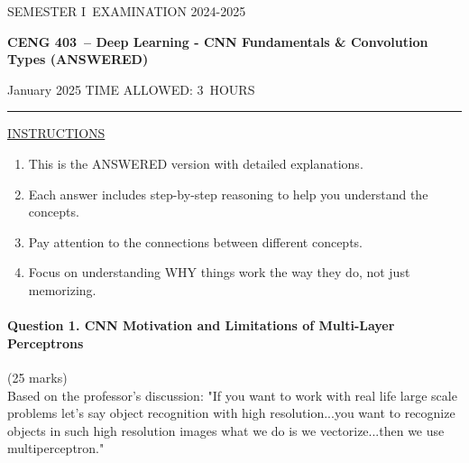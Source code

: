\documentclass[12pt]{article}
\newcommand{\masunitnumber}{CENG 403}
\newcommand{\examdate}{January 2025}
\newcommand{\academicyear}{2024-2025}
\newcommand{\semester}{I}
\newcommand{\coursename}{Deep Learning - CNN Fundamentals \& Convolution Types (ANSWERED)}
\newcommand{\numberofhours}{3}
\begin{document}
\setlength{\headsep}{5truemm}
\setlength{\headheight}{14.5truemm}
\setlength{\voffset}{-0.45truein}
\renewcommand{\headrulewidth}{0.0pt}
\begin{center}
SEMESTER \semester\ EXAMINATION \academicyear
\end{center}
\begin{center}
{\bf \masunitnumber\ -- \coursename}
\end{center}
\vspace{20truemm}
\noindent \examdate\hspace{45truemm} TIME ALLOWED: \numberofhours\ HOURS
\vspace{19truemm}
\hrule
\vspace{19truemm}
\noindent\underline{INSTRUCTIONS}
\vspace{8truemm}
\begin{enumerate}
\item This is the ANSWERED version with detailed explanations.
\item Each answer includes step-by-step reasoning to help you understand the concepts.
\item Pay attention to the connections between different concepts.
\item Focus on understanding WHY things work the way they do, not just memorizing.
\end{enumerate}

\newpage
\lhead{}
\rhead{\masunitnumber}
\chead{}
\lfoot{}
\cfoot{\thepage}
\rfoot{}
\setlength{\footskip}{45pt}


\paragraph{Question 1. CNN Motivation and Limitations of Multi-Layer Perceptrons}{\hfill (25 marks)}\\
Based on the professor's discussion: "If you want to work with real life large scale problems let's say object recognition with high resolution...you want to recognize objects in such high resolution images what we do is we vectorize...then we use multiperceptron."
\end{document}
